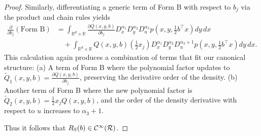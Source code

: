 \begin{proof}
Similarly, differentiating a generic term of Form B with respect to $b_j$ via the product and chain rules yields
\begin{align*}
    \frac{\partial}{\partial b_j} (\text{Form B}) &= \int_{\mathbb{R}^d \times \mathbb{R}} \frac{\partial Q(x,y,b)}{\partial b_j} D_x^{\alpha_1} D_y^{\alpha_2} D_u^{\alpha_3} p\left(x, y, \tfrac{1}{2}b^\top x\right) dy \, dx \\
    &\quad + \int_{\mathbb{R}^d \times \mathbb{R}} Q(x,y,b) \left( \frac{1}{2}x_j \right) D_x^{\alpha_1} D_y^{\alpha_2} D_u^{\alpha_3+1} p\left(x, y, \tfrac{1}{2}b^\top x\right) dy \, dx.
\end{align*}
This calculation again produces a combination of terms that fit our canonical structure:
(a) A term of Form B where the polynomial factor updates to $\tilde{Q}_1(x,y,b) = \frac{\partial Q(x,y,b)}{\partial b_j}$, preserving the derivative order of the density.
(b) Another term of Form B where the new polynomial factor is $\tilde{Q}_2(x,y,b) = \frac{1}{2}x_j Q(x,y,b)$, and the order of the density derivative with respect to $u$ increases to $\alpha_3+1$. 

Thus it follows that $R_{\mathrm{S}}(b) \in \mathcal{C}^\infty(\mathcal{R})$.
\fi




\end{proof}
